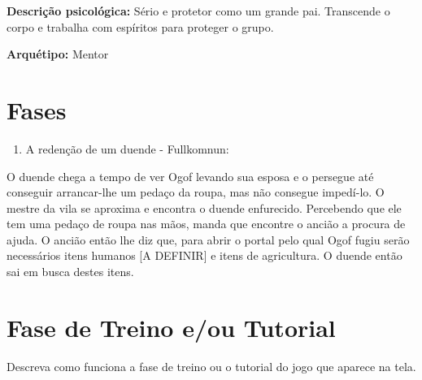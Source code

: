 \textbf{Descrição psicológica:} Sério e protetor como um grande pai. Transcende o corpo e trabalha com espíritos para proteger o grupo.

\textbf{Arquétipo:} Mentor

\section{Fases}

\begin{enumerate}
\item A redenção de um duende - Fullkomnun: 
\end{enumerate}
O duende chega a tempo de ver Ogof levando sua esposa e o persegue até conseguir arrancar-lhe um pedaço da roupa, mas não consegue impedí-lo. O mestre da vila se aproxima e encontra o duende enfurecido. Percebendo que ele tem uma pedaço de roupa nas mãos,  manda que encontre o ancião a procura de ajuda. 
O ancião então lhe diz que, para abrir o portal pelo qual Ogof fugiu serão necessários itens humanos [A DEFINIR] e itens de agricultura. O duende então sai em busca destes itens.


\section{Fase de Treino e/ou Tutorial}

Descreva como funciona a fase de treino ou o tutorial do jogo que aparece na tela.
